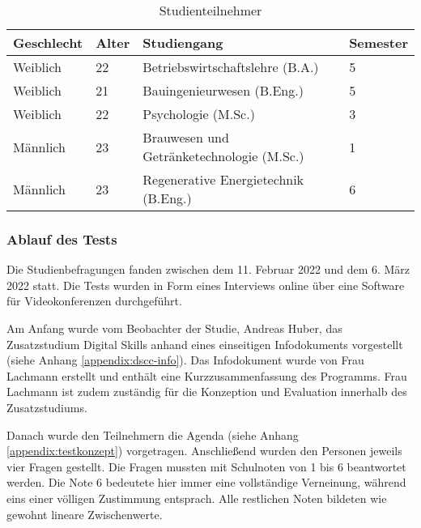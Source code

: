 \begin{table}[H]
\renewcommand*{\arraystretch}{1.6}
\centering
\begin{tabular}{|l|l|l|l|}
\hline
\textbf{Geschlecht} & \textbf{Alter} & \textbf{Studiengang}                      & \textbf{Semester} \\ \hline
Weiblich            & 22             & Betriebswirtschaftslehre (B.A.)           & 5                 \\ \hline
Weiblich            & 21             & Bauingenieurwesen (B.Eng.)                & 5                 \\ \hline
Weiblich            & 22             & Psychologie (M.Sc.)                       & 3                 \\ \hline
Männlich            & 23             & Brauwesen und Getränketechnologie (M.Sc.) & 1                 \\ \hline
Männlich            & 23             & Regenerative Energietechnik (B.Eng.)     & 6                 \\ \hline
\end{tabular}
\caption{Studienteilnehmer}

\label{table:studie-teilnehmende}
\end{table}

\subsubsection{Ablauf des Tests}
Die Studienbefragungen fanden zwischen dem 11. Februar 2022 und dem 6. März 2022
statt. Die Tests wurden in Form eines Interviews online über eine Software für
Videokonferenzen durchgeführt.

Am Anfang wurde vom Beobachter der Studie, Andreas Huber, das Zusatzstudium
Digital Skills anhand eines einseitigen Infodokuments vorgestellt (siehe Anhang
\ref{appendix:dscc-info}). Das Infodokument wurde von Frau Lachmann erstellt und
enthält eine Kurzzusammenfassung des Programms. Frau Lachmann ist zudem 
zuständig für die Konzeption und Evaluation innerhalb des Zusatzstudiums.

Danach wurde den Teilnehmern die Agenda (siehe Anhang
\ref{appendix:testkonzept}) vorgetragen. Anschließend wurden den Personen
jeweils vier Fragen gestellt. Die Fragen mussten mit Schulnoten von 1 bis 6
beantwortet werden. Die Note 6 bedeutete hier immer eine vollständige
Verneinung, während eins einer völligen Zustimmung entsprach. Alle restlichen
Noten bildeten wie gewohnt lineare Zwischenwerte.

